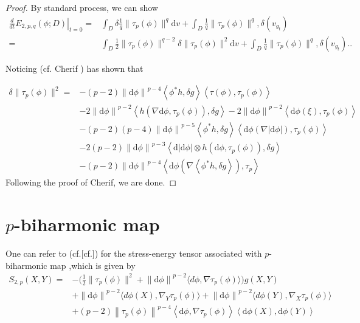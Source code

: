 \documentclass[12pt,UTF8]{article}
\theoremstyle{plain}
\theoremstyle{definition}
\def\d {\mathrm{d}}
\def\na{\ensuremath{\nabla}}
\renewcommand{\d}[1]{\mathbb{#1}}
\renewcommand{\(}{\left(}
\renewcommand{\)}{\right)}
\newcommand{\norm}[1]{\left\lVert#1\right\rVert}%
\numberwithin{equation}{subsection}
\def\na{\nabla}
\renewcommand{\(}{\left(}
\renewcommand{\)}{\right)}
\def\d{\mathrm{d}}
\def \d {\mathrm{d}}
\numberwithin{equation}{section}
\begin{document}
\begin{proof}By standard process, we can show 
	\begin{equation}
		\begin{split}
			\left.\frac{d}{dt}E_{2,p,q}(\phi;D)\right|_{t=0}
			=& \int_D \delta  \frac{1}{q}	 \|\tau_p(\phi)\|^q\d v
			+ \int_D \frac{1}{q}	 \|\tau_p(\phi)\|^q,\delta(v_{g_t})\\
			=& \int_D   \frac{1}{2} \|\tau_p(\phi)\|^{q-2}	 \delta\|\tau_p(\phi)\|^2\d v
			+ \int_D \frac{1}{q}	 \|\tau_p(\phi)\|^q,\delta(v_{g_t})..
		\end{split}
	\end{equation}
	
Noticing (cf. Cherif \cite{zbMATH07894526})  has shown that 
	
	\begin{equation}
		\begin{split}
			\delta\|\tau_p(\phi)\|^2=&-(p-2)\norm{\d \phi}^{p-4}\left\langle  \phi^*h,\delta g \right\rangle \left\langle \tau(\phi), \tau_p(\phi)\right\rangle \\
			&-2\norm{\d \phi}^{p-2}\left\langle h( \na \d \phi,\tau_p(\phi)) , \delta g \right\rangle -2\norm{\d \phi}^{p-2}\left\langle \d \phi(\xi), \tau_p(\phi) \right\rangle \\
			&-(p-2)(p-4)\norm{\d \phi}^{p-5}\left\langle  \phi^*h,\delta g \right\rangle \left\langle \d \phi (\na |\d \phi|) , \tau_p(\phi) \right\rangle \\
			&-2(p-2)\norm{\d \phi}^{p-3} \left\langle \d |\d \phi|\otimes h(\d \phi, \tau_p(\phi)) ,\delta g \right\rangle \\
			&-(p-2)\norm{\d \phi}^{p-4} \left\langle  \d \phi (\na \left\langle  \phi^*h,\delta g \right\rangle  ),\tau_p\right\rangle 
		\end{split}
	\end{equation}
Following the proof of  Cherif\cite{zbMATH07894526}, we are done.
	
\end{proof}

	
\section{$p$-biharmonic map}	
 One can refer to (cf.[cf.\cite{zbMATH07894526}]) for the stress-energy tensor  associated with $p$-biharmonic map ,which is given by  
\begin{equation}
	\begin{split}
			S_{2,p}(X,Y)=&-\big(\frac{1}{2}\|\tau_p(\phi)\|^{2}+\norm{\d \phi}^{p-2}\langle d\phi,\na\tau_p(\phi)\rangle\big)g(X,Y)\\
		&+\norm{\d \phi}^{p-2}\langle d\phi(X),\na_Y\tau_p(\phi)\rangle+\norm{\d \phi}^{p-2}\langle d\phi(Y),\na_X\tau_p(\phi)\rangle\\
		&+(p-2)\norm{\tau_p(\phi)}^{p-4}\left\langle \d \phi,\na \tau_p(\phi) \right\rangle\left\langle \d \phi(X),\d \phi(Y) \right\rangle
	\end{split}
\end{equation}
\end{document}

